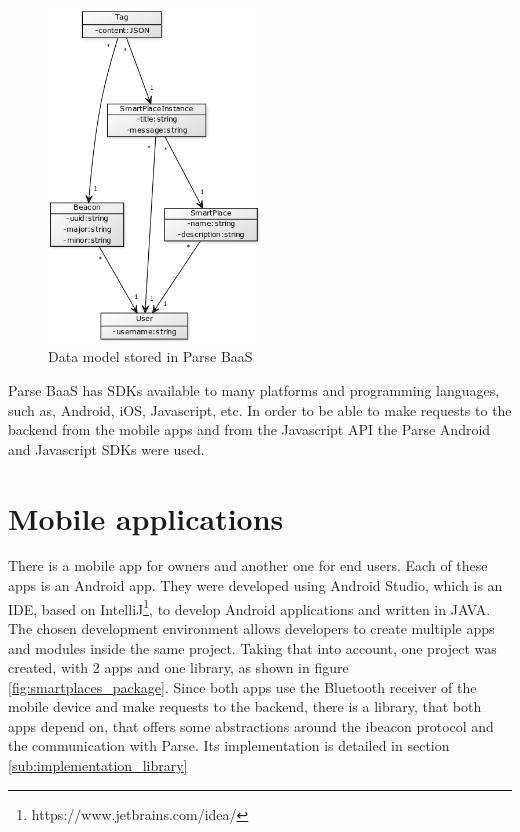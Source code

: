 \begin{figure}[!ht]
  \centering
    \includegraphics[width=0.5\textwidth]{images/backend_data_model}
    \caption{Data model stored in Parse \gls{BaaS}}
    \label{fig:backend_data_model}
\end{figure}

Parse \gls{BaaS} has \glspl{SDK} available to many platforms and programming
languages, such as, Android, iOS, Javascript, etc.
In order to be able to make requests to the backend from the mobile apps and
from the Javascript API
the Parse Android and Javascript \glspl{SDK} were used.

\section{Mobile applications}
\label{sec:mobile_applications}
There is a mobile app for owners and another one for end users.
Each of these apps is an Android app. They were developed using Android
Studio, which is an \gls{IDE}, based on
IntelliJ\footnote{https://www.jetbrains.com/idea/},
to develop Android
applications and written in JAVA.
The chosen development environment allows developers to create multiple
apps and modules inside the same project.
Taking that into account,
one project was created, with 2 apps and one library, as shown in figure
\ref{fig:smartplaces_package}. Since both apps use the Bluetooth receiver
of the mobile device and make requests to the backend, there is a library,
that both apps depend on, that offers some abstractions around the ibeacon
protocol and the communication with Parse.
Its implementation is detailed in section \ref{sub:implementation_library}

